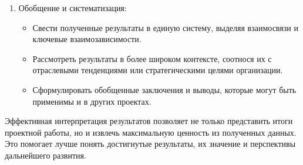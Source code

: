 \begin{enumerate}
\begin{itemize}
            \item Определить ключевые ограничения, недостатки или проблемы, выявленные в ходе реализации проекта.
            \item Сформулировать рекомендации по дальнейшему развитию и совершенствованию проекта.
        \end{itemize}
    \item Обобщение и систематизация:
        \begin{itemize}
            \item Свести полученные результаты в единую систему, выделяя взаимосвязи и ключевые взаимозависимости.
            \item Рассмотреть результаты в более широком контексте, соотнося их с отраслевыми тенденциями или стратегическими целями организации.
            \item Сформулировать обобщенные заключения и выводы, которые могут быть применимы и в других проектах.
        \end{itemize}
\end{enumerate}

Эффективная интерпретация результатов позволяет не только представить итоги проектной работы, но и извлечь максимальную ценность из полученных данных. Это помогает лучше понять достигнутые результаты, их значение и перспективы дальнейшего развития.

